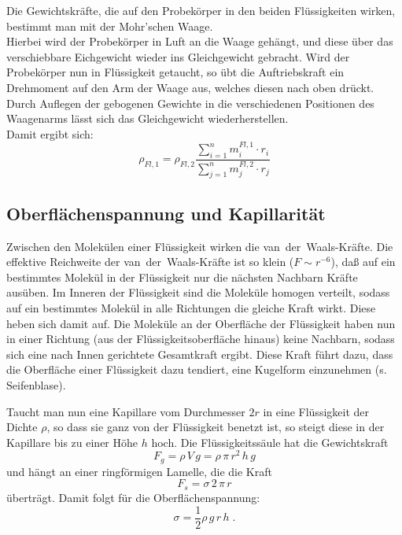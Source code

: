 Die Gewichtskräfte, die auf den Probekörper in den beiden Flüssigkeiten wirken, bestimmt man mit der Mohr'schen Waage. \\
Hierbei wird der Probekörper in Luft an die Waage gehängt, und diese über das verschiebbare Eichgewicht wieder ins Gleichgewicht gebracht. Wird der Probekörper nun in Flüssigkeit getaucht, so übt die Auftriebskraft ein Drehmoment auf den Arm der Waage aus, welches diesen nach oben drückt. Durch Auflegen der gebogenen Gewichte in die verschiedenen Positionen des Waagenarms lässt sich das Gleichgewicht wiederherstellen.\\
Damit ergibt sich:
\begin{equation}
 \rho_{Fl,1} = \rho_{Fl,2}\frac{\sum_{i=1}^n{m_i^{Fl,1}\cdot r_i}}{\sum_{j=1}^n{m_j^{Fl,2}\cdot r_j}}
\end{equation}

\subsection{Oberflächenspannung und Kapillarität}

Zwischen den Molekülen einer Flüssigkeit wirken die van~der~Waals-Kräfte. Die effektive Reichweite der van~der~Waals-Kräfte ist so klein ($F\sim r^{-6}$), daß auf ein bestimmtes Molekül in der Flüssigkeit nur die nächsten Nachbarn Kräfte ausüben. Im Inneren der Flüssigkeit sind die Moleküle homogen verteilt, sodass auf ein bestimmtes Molekül in alle Richtungen die gleiche Kraft wirkt. Diese heben sich damit auf. Die Moleküle an der Oberfläche der Flüssigkeit haben nun in einer Richtung (aus der Flüssigkeitsoberfläche hinaus) keine Nachbarn, sodass sich eine nach Innen gerichtete Gesamtkraft ergibt. Diese Kraft führt dazu, dass die Oberfläche einer Flüssigkeit dazu tendiert, eine Kugelform einzunehmen (s. Seifenblase).

Taucht man nun eine Kapillare vom Durchmesser $2r$ in eine Flüssigkeit der Dichte $\rho$, so dass sie ganz von der Flüssigkeit benetzt ist, so steigt diese in der Kapillare bis zu einer Höhe $h$ hoch. Die Flüssigkeitssäule hat die Gewichtskraft
\begin{equation}
 F_g = \rho\, V\, g = \rho\,\pi\, r^2\, h\, g
\end{equation}
und hängt an einer ringförmigen Lamelle, die die Kraft
\begin{equation}
 F_s = \sigma\, 2\,\pi\, r
\end{equation}
überträgt. Damit folgt für die Oberflächenspannung:
\begin{equation} \label{eq:Oberflaechenspannung}
 \sigma = \frac{1}{2}\rho\,g\,r\,h\; .
\end{equation}


